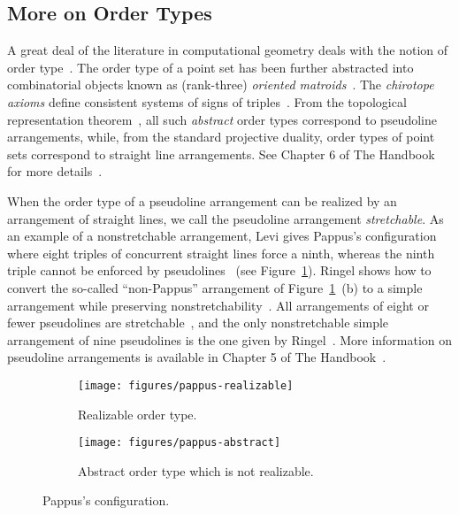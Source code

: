 \subsection{More on Order Types}%
\label{sec:problem:pol:order-types}

A great deal of the literature in computational geometry deals with the notion
of order type~\cite{%
AAK02a,
AAK02b,
ACKLV16,
AKPV14,
AK01,
AK05,
AKMPW15,
AMP13,
Al86,
AILOW14,
BLSWZ93,
BMS01,
BRS92,
Epp18,
EHN99,
Fe96,
FV11,
FL78,
Go80,
GP83,
GP84,
GP86,
GP91,
GP93,
GPS89,
HM94,
HMMS11,
Knu92,
Le26,
MMIB12,
NV98,
Ri89,
RZ04,
Ri56,
St97%
}.
The order type of a point set has been further abstracted into combinatorial
objects known as (rank-three) \emph{oriented matroids}~\cite{FL78}. The
\emph{chirotope axioms} define consistent systems of signs of
triples~\cite{BLSWZ93}.
%
From the topological representation theorem~\cite{BMS01}, all such
\emph{abstract} order types correspond to pseudoline arrangements, while, from
the standard projective duality, order types of point sets correspond to
straight line arrangements. See Chapter 6 of The Handbook for more
details~\cite{RZ04}.

When the order type of a pseudoline arrangement can be realized by an
arrangement of straight lines, we call the pseudoline arrangement
\emph{stretchable}.
%
As an example of a nonstretchable arrangement, Levi gives Pappus's
configuration where eight triples of concurrent straight lines force a ninth,
whereas the ninth triple cannot be enforced by pseudolines~\cite{Le26} (see
Figure~\ref{fig:pappus}).
%
Ringel shows how to convert the so-called ``non-Pappus'' arrangement of
Figure~\ref{fig:pappus}~(b) to a simple arrangement while preserving
nonstretchability~\cite{Ri56}.
%
All arrangements of eight or fewer pseudolines are stretchable~\cite{GP80}, and
the only nonstretchable simple arrangement of nine pseudolines is the one given
by Ringel~\cite{Ri89}.
%
More information on pseudoline arrangements is available in Chapter 5 of The
Handbook~\cite{Goo04}.

\begin{figure}
	\centering{}
    \begin{subfigure}[t]{0.5\textwidth}
		\centering{}
		\texttt{[image: figures/pappus-realizable]}
		\caption{Realizable order type.}
    \end{subfigure}%
    \begin{subfigure}[t]{0.5\textwidth}
		\centering{}
		\texttt{[image: figures/pappus-abstract]}
		\caption{Abstract order type which is not realizable.}
    \end{subfigure}
	\caption{Pappus's configuration.}\label{fig:pappus}
\end{figure}

